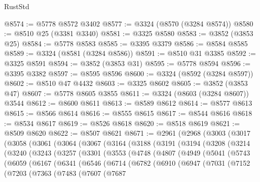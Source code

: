 \begin{lexlean}{RustStd}
\begin{coremodule}
@8574 := @5778 @8572 @3402
@8577 := @3324 (@8570 (@3284 @8574))
@8580 := @8510 @25 (@3381 @3340)
@8581 := @3325 @8580
@8583 := @3852 (@3853 @25)
@8584 := @5778 @8583
@8585 := @3395 @3379
@8586 := @8584 @8585
@8589 := @3324 (@8581 (@3284 @8586))
@8591 := @8510 @31 @3385
@8592 := @3325 @8591
@8594 := @3852 (@3853 @31)
@8595 := @5778 @8594
@8596 := @3395 @3382
@8597 := @8595 @8596
@8600 := @3324 (@8592 (@3284 @8597))
@8602 := @8510 @47 @4432
@8603 := @3325 @8602
@8605 := @3852 (@3853 @47)
@8607 := @5778 @8605 @3855
@8611 := @3324 (@8603 (@3284 @8607)) @3544
@8612 := @8600 @8611
@8613 := @8589 @8612
@8614 := @8577 @8613
@8615 := @8566 @8614
@8616 := @8555 @8615
@8617 := @8544 @8616
@8618 := @8534 @8617
@8619 := @8526 @8618
@8620 := @8518 @8619
@8621 := @8509 @8620
@8622 := @8507 @8621
@8671 := @2961
    (@2968
      (@3003
        (@3017
          (@3058
            (@3061
              (@3064
                (@3067
                  (@3164
                    (@3188
                      (@3191
                        (@3194
                          (@3208
                            (@3214
                              (@3240
                                (@3243
                                  (@3257
                                    (@3301
                                      (@3553
                                        (@4748
                                          (@4807
                                            (@4949
                                              (@5041
                                                (@5743
                                                  (@6059
                                                    (@6167
                                                      (@6341
                                                        (@6546
                                                          (@6714
                                                            (@6782
                                                              (@6910
                                                                (@6947
                                                                  (@7031
                                                                    (@7152
                                                                      (@7203
                                                                        (@7363
                                                                          (@7483
                                                                            (@7607
                                                                              (@7687

\end{coremodule}
\end{lexlean}
